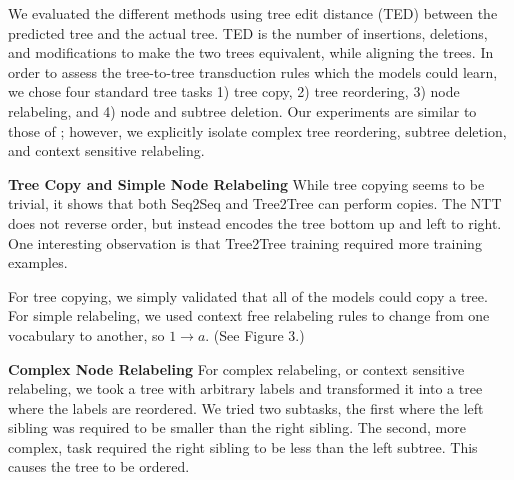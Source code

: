 \documentclass{article}
\begin{document}




We evaluated the different methods using tree edit distance (TED) \citep{tai1979tree,bille2005survey} between the predicted tree and the actual tree. TED is the number of insertions, deletions, and modifications to make the two trees equivalent, while aligning the trees. In order to assess the tree-to-tree transduction rules which the models could learn, we chose four standard tree tasks 1) tree copy, 2) tree reordering, 3) node relabeling, and 4) node and subtree deletion. Our experiments are similar to those of \citet{grefenstette2015learning}; however, we explicitly isolate complex tree reordering, subtree deletion, and context sensitive relabeling.



{\bf Tree Copy and Simple Node Relabeling}
While tree copying seems to be trivial, it shows that both Seq2Seq and Tree2Tree can perform copies. The NTT does not reverse order, but instead encodes the tree bottom up and left to right. One interesting observation is that Tree2Tree training required more training examples.

For tree copying, we simply validated that all of the models could copy a tree. For simple relabeling, we used context free relabeling rules to change from one vocabulary to another, so $1 \rightarrow a$. (See Figure 3.)

%
%




{\bf Complex Node Relabeling}
For complex relabeling, or context sensitive relabeling, we took a tree with arbitrary labels and transformed it into a tree where the labels are reordered. We tried two subtasks, the first where the left sibling was required to be smaller than the right sibling. The second, more complex, task required the right sibling to be less than the left subtree. This causes the tree to be ordered.
\end{document}

